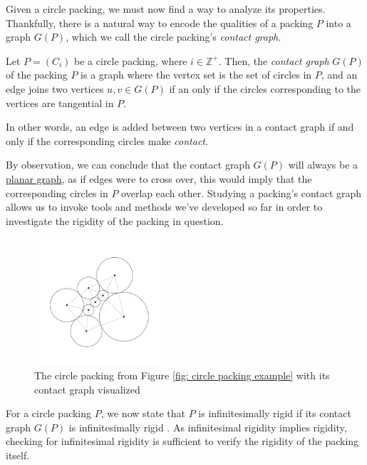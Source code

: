 \begin{flushleft}
Given a circle packing, we must now find a way to analyze its properties. Thankfully, there is a natural way to encode the qualities of a packing $P$ into a graph $G(P)$, which we call the circle packing's \textit{contact graph}.
\end{flushleft}

\begin{definition}
\label{def: contact graph}
Let $P = (C_i)$ be a circle packing, where $i \in \mathbb{Z}^+$. Then, the \textit{contact graph} $G(P)$ of the packing $P$ is a graph where the vertex set is the set of circles in $P$, and an edge joins two vertices $u, v \in G(P)$ if an only if the circles corresponding to the vertices are tangential in $P$.
\end{definition}

\begin{flushleft}
In other words, an edge is added between two vertices in a contact graph if and only if the corresponding circles make \textit{contact}.
\end{flushleft}

\begin{flushleft}
By observation, we can conclude that the contact graph $G(P)$ will always be a \hyperref[def: planar graphs]{planar graph}, as if edges were to cross over, this would imply that the corresponding circles in $P$ overlap each other. Studying a packing's contact graph allows us to invoke tools and methods we've developed so far in order to investigate the rigidity of the packing in question. 
\end{flushleft}

\begin{figure}[htbp]
    \centering
    \includegraphics[width = 0.42\textwidth]{Chapter 3/8. Packing with contact.png}
    \caption{The circle packing from Figure \ref{fig: circle packing example} with its contact graph visualized}
    \label{fig: circle packing with contact}
\end{figure}
\vspace{-4 mm}
\begin{flushleft}
For a circle packing $P$, we now state that $P$ is infinitesimally rigid if its contact graph $G(P)$ is infinitesimally rigid \cite{sticky}. As infinitesimal rigidity implies rigidity, checking for infinitesimal rigidity is sufficient to verify the rigidity of the packing itself. 
\end{flushleft}

